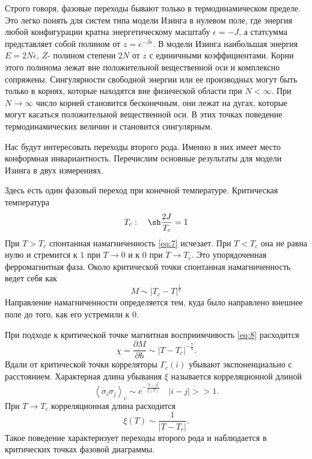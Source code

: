 \documentclass[a4paper,12pt]{article}
\theoremstyle{definition}
\theoremstyle{definition}
\theoremstyle{definition}
\begin{document}
Строго говоря, фазовые переходы бывают только в термодинамическом пределе. Это легко понять для
систем типа модели Изинга в нулевом поле, где энергия любой конфигурации кратна энергетическому
масштабу $\epsilon=-J$, а статсумма представляет собой полином от $z=e^{-\beta\epsilon}$. В модели
Изинга наибольшая энергия $E=2N\epsilon$, $Z$- полином степени $2N$ от $z$ с единичными
коэффициентами. Корни этого полинома лежат вне положительной вещественной оси и комплексно
сопряжены. Сингулярности свободной энергии или ее производных могут быть только в корнях, которые
находятся вне физической области при $N<\infty$. При $N\to \infty$ число корней становится
бесконечным, они лежат на дугах, которые могут касаться положительной вещественной оси. В этих
точках поведение термодинамических величин и становится сингулярным. 

Нас будут интересовать переходы второго рода. Именно в них имеет место конформная инвариантность. 
Перечислим основные результаты для модели Изинга в двух измерениях.

Здесь есть один фазовый переход при конечной температуре. 
Критическая температура
\begin{equation}
  \label{eq:27}
  T_c:\quad \sh \frac{2J}{T_c}=1
\end{equation}
При $T>T_c$ спонтанная намагниченность \eqref{eq:7} исчезает. При $T<T_c$ она не равна нулю и
стремится к $1$ при $T\to 0$ и к $0$ при $T\to T_c$. Это упорядоченная ферромагнитная фаза. Около
критической точки спонтанная намагниченность ведет себя как 
\begin{equation}
  \label{eq:28}
  M\sim \left|T_c-T\right|^{\frac{1}{8}}
\end{equation}
Направление намагниченности определяется тем, куда было направлено внешнее поле до того, как его устремили к $0$. 

При подходе к критической точке магнитная восприимчивость \eqref{eq:8} расходится
\begin{equation}
  \label{eq:29}
  \chi=\frac{\partial M}{\partial h}\sim \left|T-T_c \right|^{-\frac{7}{4}}.
\end{equation}
Вдали от критической точки корреляторы $\Gamma_c(i)$ убывают экспоненциально с расстоянием.
Характерная длина убывания $\xi$ называется корреляционной длиной 
\begin{equation}
  \label{eq:30}
  \left<\sigma_i\sigma_j\right>_c\sim e^{-\frac{\left|i-j\right|}{\xi(T)}}\quad \left|i-j\right|>>1.
\end{equation}
При $T\to T_c$ корреляционная длина расходится
\begin{equation}
  \label{eq:31}
  \xi(T)\sim \frac{1}{\left|T-T_c\right|}.
\end{equation}
Такое поведение характеризует переходы второго рода и наблюдается в критических точках фазовой диаграммы.
\end{document}

